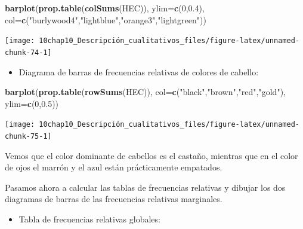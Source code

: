 \documentclass[
]{book}
\newenvironment{Shaded}{\begin{snugshade}}{\end{snugshade}}
\newcommand{\DataTypeTok}[1]{\textcolor[rgb]{0.13,0.29,0.53}{#1}}
\newcommand{\DecValTok}[1]{\textcolor[rgb]{0.00,0.00,0.81}{#1}}
\newcommand{\FloatTok}[1]{\textcolor[rgb]{0.00,0.00,0.81}{#1}}
\newcommand{\KeywordTok}[1]{\textcolor[rgb]{0.13,0.29,0.53}{\textbf{#1}}}
\newcommand{\NormalTok}[1]{#1}
\newcommand{\StringTok}[1]{\textcolor[rgb]{0.31,0.60,0.02}{#1}}
\providecommand{\tightlist}{%
  \setlength{\itemsep}{0pt}\setlength{\parskip}{0pt}}
\theoremstyle{definition}
\theoremstyle{definition}
\theoremstyle{definition}
\theoremstyle{remark}
\begin{document}
\begin{Shaded}
\begin{Highlighting}[]
\KeywordTok{barplot}\NormalTok{(}\KeywordTok{prop.table}\NormalTok{(}\KeywordTok{colSums}\NormalTok{(HEC)), }\DataTypeTok{ylim=}\KeywordTok{c}\NormalTok{(}\DecValTok{0}\NormalTok{,}\FloatTok{0.4}\NormalTok{),}
  \DataTypeTok{col=}\KeywordTok{c}\NormalTok{(}\StringTok{"burlywood4"}\NormalTok{,}\StringTok{"lightblue"}\NormalTok{,}\StringTok{"orange3"}\NormalTok{,}\StringTok{"lightgreen"}\NormalTok{))}
\end{Highlighting}
\end{Shaded}

\begin{center}\texttt{[image: 10chap10\_Descripción\_cualitativos\_files/figure-latex/unnamed-chunk-74-1]} \end{center}

\begin{itemize}
\tightlist
\item
  Diagrama de barras de frecuencias relativas de colores de cabello:
\end{itemize}

\begin{Shaded}
\begin{Highlighting}[]
\KeywordTok{barplot}\NormalTok{(}\KeywordTok{prop.table}\NormalTok{(}\KeywordTok{rowSums}\NormalTok{(HEC)),}
  \DataTypeTok{col=}\KeywordTok{c}\NormalTok{(}\StringTok{"black"}\NormalTok{,}\StringTok{"brown"}\NormalTok{,}\StringTok{"red"}\NormalTok{,}\StringTok{"gold"}\NormalTok{), }\DataTypeTok{ylim=}\KeywordTok{c}\NormalTok{(}\DecValTok{0}\NormalTok{,}\FloatTok{0.5}\NormalTok{))}
\end{Highlighting}
\end{Shaded}

\begin{center}\texttt{[image: 10chap10\_Descripción\_cualitativos\_files/figure-latex/unnamed-chunk-75-1]} \end{center}

Vemos que el color dominante de cabellos es el castaño, mientras que en el color de ojos el marrón y el azul están prácticamente empatados.

Pasamos ahora a calcular las tablas de frecuencias relativas y dibujar los dos diagramas de barras de las frecuencias relativas marginales.

\begin{itemize}
\tightlist
\item
  Tabla de frecuencias relativas globales:
\end{itemize}
\end{document}
